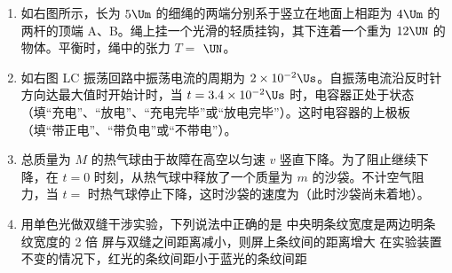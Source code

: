 \documentclass[\gkver]{gaokaozhenti}
\begin{document}
\begin{enumerate}
\item
如右图所示，长为 $5\Um$ 的细绳的两端分别系于竖立在地面上相距为 $4\Um$ 的两杆的顶端 A、B。绳上挂一个光滑的轻质挂钩，其下连着一个重为 $12\UN$ 的物体。平衡时，绳中的张力 $T =$ $\UN$。
\onepicture[align=right, w=5.00cm]{}
\jdanswer{
$10\UN$
}

\item
如右图 LC 振荡回路中振荡电流的周期为 $2 \times 10^{-2}\Us$。自振荡电流沿反时针方向达最大值时开始计时，当 $t = 3.4 \times 10^{-2}\Us$ 时，电容器正处于状态（填“充电”、“放电”、“充电完毕”或“放电完毕”）。这时电容器的上极板（填“带正电”、“带负电”或“不带电”）。
\onepicture[align=right, w=4.00cm]{}

\item
总质量为 $M$ 的热气球由于故障在高空以匀速 $v$ 竖直下降。为了阻止继续下降，在 $t = 0$ 时刻，从热气球中释放了一个质量为 $m$ 的沙袋。不计空气阻力，当 $t =$  时热气球停止下降，这时沙袋的速度为（此时沙袋尚未着地）。

\item
用单色光做双缝干涉实验，下列说法中正确的是
{中央明条纹宽度是两边明条纹宽度的 2 倍}
{屏与双缝之间距离减小，则屏上条纹间的距离增大}
{在实验装置不变的情况下，红光的条纹间距小于蓝光的条纹间距}


\end{enumerate}
\end{document}

